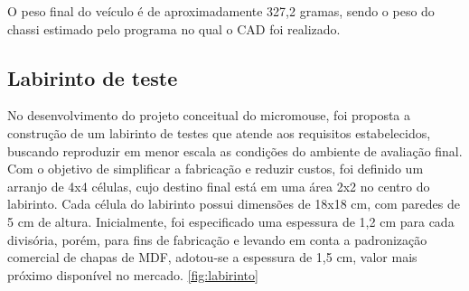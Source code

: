 \begin{table}[H]
    \centering
    \caption{Pesagem dos componentes}
    \label{tab:peso_componentes}
    \scriptsize
\end{table}

O peso final do veículo é de aproximadamente 327,2 gramas, sendo o peso do chassi estimado pelo programa no qual o CAD foi realizado.

\subsection{Labirinto de teste}
No desenvolvimento do projeto conceitual do micromouse, foi proposta a construção de um labirinto de testes que atende aos requisitos estabelecidos, buscando reproduzir em menor escala as condições do ambiente de avaliação final. Com o objetivo de simplificar a fabricação e reduzir custos, foi definido um arranjo de 4x4 células, cujo destino final está em uma área 2x2 no centro do labirinto. Cada célula do labirinto possui dimensões de 18x18 cm, com paredes de 5 cm de altura. Inicialmente, foi especificado uma espessura de 1,2 cm para cada divisória, porém, para fins de fabricação e levando em conta a padronização comercial de chapas de MDF, adotou-se a espessura de 1,5 cm, valor mais próximo disponível no mercado. \ref{fig:labirinto}

